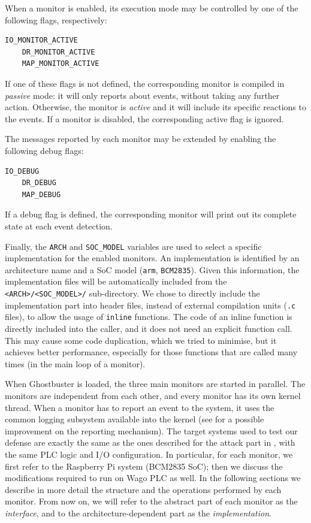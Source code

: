 When a monitor is enabled, its execution mode may be controlled by one of the following flags, respectively:
\begin{Verbatim}[fontsize=\small]
	IO_MONITOR_ACTIVE
	DR_MONITOR_ACTIVE
	MAP_MONITOR_ACTIVE
\end{Verbatim}
If one of these flags is not defined, the corresponding monitor is compiled in \emph{passive} mode: it will only reports about events, without taking any further action.
Otherwise, the monitor is \emph{active} and it will include its specific reactions to the events.
If a monitor is disabled, the corresponding active flag is ignored.

The messages reported by each monitor may be extended by enabling the following debug flags:
\begin{Verbatim}[fontsize=\small]
	IO_DEBUG
	DR_DEBUG
	MAP_DEBUG
\end{Verbatim}
If a debug flag is defined, the corresponding monitor will print out its complete state at each event detection.

Finally, the \verb|ARCH| and \verb|SOC_MODEL| variables are used to select a specific implementation for the enabled monitors.
An implementation is identified by an architecture name and a SoC model (\eg \verb|arm|, \verb|BCM2835|). Given this information,
the implementation files will be automatically included from the \verb|<ARCH>/<SOC_MODEL>/| sub-directory.
We chose to directly include the implementation part into header files, instead of external compilation units (\verb|.c| files), to allow the usage of \verb|inline|
functions. The code of an inline function is directly included into the caller, and it does not need an explicit function call.
This may cause some code duplication, which we tried to minimise, but it achieves better performance,
especially for those functions that are called many times (\eg in the main loop of a monitor).

When Ghostbuster is loaded, the three main monitors are started in parallel.
The monitors are independent from each other, and every monitor has its own kernel thread.
When a monitor has to report an event to the system, it uses the common logging subsystem available into the kernel
(see  for a possible improvement on the reporting mechanism).
The target systems used to test our defense are exactly the same as the ones described for the attack part in , with the same PLC logic and I/O configuration.
In particular, for each monitor, we first refer to the Raspberry Pi system (BCM2835 SoC); then we discuss the modifications required to run on Wago PLC as well.
In the following sections we describe in more detail the structure and the operations performed by each monitor.
From now on, we will refer to the abstract part of each monitor as the \emph{interface}, and to the architecture-dependent part as the \emph{implementation}.


